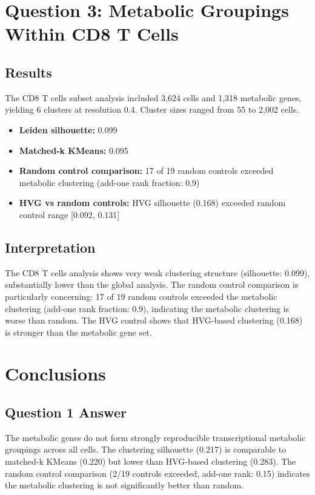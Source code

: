 \documentclass[11pt]{article}
\begin{document}
\section{Question 3: Metabolic Groupings Within CD8 T Cells}

\subsection{Results}

The CD8 T cells subset analysis included 3,624 cells and 1,318 metabolic genes, yielding 6 clusters at resolution 0.4. Cluster sizes ranged from 55 to 2,002 cells.

\begin{itemize}
    \item \textbf{Leiden silhouette:} 0.099
    \item \textbf{Matched-k KMeans:} 0.095
    \item \textbf{Random control comparison:} 17 of 19 random controls exceeded metabolic clustering (add-one rank fraction: 0.9)
    \item \textbf{HVG vs random controls:} HVG silhouette (0.168) exceeded random control range [0.092, 0.131]
\end{itemize}

\subsection{Interpretation}

The CD8 T cells analysis shows very weak clustering structure (silhouette: 0.099), substantially lower than the global analysis. The random control comparison is particularly concerning: 17 of 19 random controls exceeded the metabolic clustering (add-one rank fraction: 0.9), indicating the metabolic clustering is worse than random. The HVG control shows that HVG-based clustering (0.168) is stronger than the metabolic gene set.

\section{Conclusions}

\subsection{Question 1 Answer}

The metabolic genes do not form strongly reproducible transcriptional metabolic groupings across all cells. The clustering silhouette (0.217) is comparable to matched-k KMeans (0.220) but lower than HVG-based clustering (0.283). The random control comparison (2/19 controls exceeded, add-one rank: 0.15) indicates the metabolic clustering is not significantly better than random.
\end{document}

